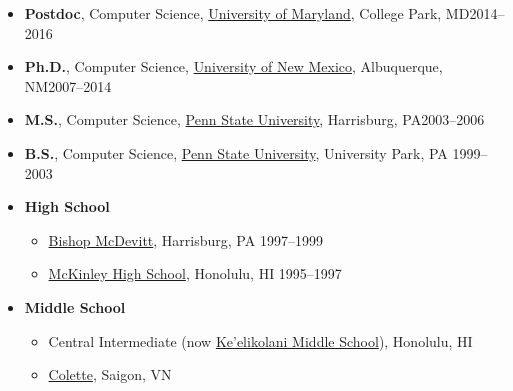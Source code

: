 \documentclass[11pt]{article}
\begin{document}
\begin{itemize}
\item \textbf{Postdoc}, Computer Science,  \href{https://www.umd.edu}{University of Maryland}, College Park, MD\hfill 2014--2016
  
\item \textbf{Ph.D.}, Computer Science,  \href{https://www.unm.edu}{University of New Mexico}, Albuquerque, NM\hfill 2007--2014
  
\item \textbf{M.S.}, Computer Science,  \href{https://www.hbg.psu.edu}{Penn State University}, Harrisburg, PA\hfill 2003--2006
  
\item \textbf{B.S.}, Computer Science, \href{https://www.psu.edu}{Penn State University}, University Park, PA \hfill 1999--2003
  \vspace{0.1in}
\item \textbf{High School}
  \begin{itemize}
  \item \href{https://www.bishopmcdevitt.org/mcd/}{Bishop McDevitt}, Harrisburg, PA \hfill 1997--1999
  \item \href{https://www.mckinley.k12.hi.us/}{McKinley High School}, Honolulu, HI \hfill 1995--1997  
  \end{itemize}
\item \textbf{Middle School}
  \begin{itemize}
  \item Central Intermediate (now \href{https://www.keelikolanimiddle.org}{Ke'elikolani Middle School}), Honolulu, HI
  \item \href{http://colette.edu.vn/}{Colette}, Saigon, VN
  \end{itemize}
  
\end{itemize}
\end{document}
